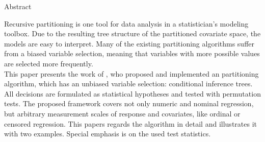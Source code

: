 \vspace*{4cm}
\begin{fullwidth}
\begin{center}
\huge{Abstract}
\end{center}
\thispagestyle{empty}
Recursive partitioning is one tool for data analysis in a statistician's modeling toolbox. 
Due to the resulting tree structure of the partitioned covariate space, the 
models are easy to interpret. Many of the existing partitioning algorithms suffer from a biased 
variable selection, meaning that variables with more possible values are selected
more frequently. \\
This paper presents the work of \citet{hothorn2006unbiased}, who proposed and implemented an 
partitioning algorithm, which has an unbiased variable selection: conditional inference trees. 
All decisions are formulated as statistical hypotheses and tested with permutation tests. The 
proposed framework covers not only numeric and nominal regression, but arbitrary measurement
scales of response and covariates, like ordinal or censored regression. 
This papers regards the algorithm in detail and illustrates it with two examples. 
Special emphasis is on the used test statistics. 
\end{fullwidth}
